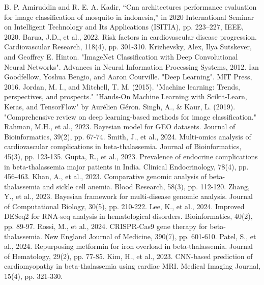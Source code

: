 \documentclass[a4paper,12pt,openbib,oneside]{memoir}
\theoremstyle{plain}
\theoremstyle{plain}
\theoremstyle{plain}
\theoremstyle{definition}
\theoremstyle{plain}
\theoremstyle{plain}
\theoremstyle{plain}
\begin{document}
\begin{thebibliography}{99}
 B. P. Amiruddin and R. E. A. Kadir, “Cnn architectures performance evaluation for image classification of mosquito in indonesia,” in 2020 International Seminar on Intelligent Technology and Its Applications (ISITIA), pp. 223–227, IEEE, 2020.
 Barua, J.D., et al., 2022. Risk factors in cardiovascular disease progression. Cardiovascular Research, 118(4), pp. 301-310.
 Krizhevsky, Alex, Ilya Sutskever, and Geoffrey E. Hinton. "ImageNet Classification with Deep Convolutional Neural Networks". Advances in Neural Information Processing Systems, 2012.
 Ian Goodfellow, Yoshua Bengio, and Aaron Courville. "Deep Learning". MIT Press, 2016.
 Jordan, M. I., and Mitchell, T. M. (2015). "Machine learning: Trends, perspectives, and prospects."
 "Hands-On Machine Learning with Scikit-Learn, Keras, and TensorFlow" by Aur\'elien G\'eron.
 Singh, A., \& Kaur, L. (2019). "Comprehensive review on deep learning-based methods for image classification."
 Rahman, M.H., et al., 2023. Bayesian model for GEO datasets. Journal of Bioinformatics, 39(2), pp. 67-74.
 Smith, J., et al., 2024. Multi-omics analysis of cardiovascular complications in beta-thalassemia. Journal of Bioinformatics, 45(3), pp. 123-135.
 Gupta, R., et al., 2023. Prevalence of endocrine complications in beta-thalassemia major patients in India. Clinical Endocrinology, 78(4), pp. 456-463.
 Khan, A., et al., 2023. Comparative genomic analysis of beta-thalassemia and sickle cell anemia. Blood Research, 58(3), pp. 112-120.
 Zhang, Y., et al., 2023. Bayesian framework for multi-disease genomic analysis. Journal of Computational Biology, 30(5), pp. 210-222.
 Lee, K., et al., 2024. Improved DESeq2 for RNA-seq analysis in hematological disorders. Bioinformatics, 40(2), pp. 89-97.
 Rossi, M., et al., 2024. CRISPR-Cas9 gene therapy for beta-thalassemia. New England Journal of Medicine, 390(7), pp. 601-610.
 Patel, S., et al., 2024. Repurposing metformin for iron overload in beta-thalassemia. Journal of Hematology, 29(2), pp. 77-85.
 Kim, H., et al., 2023. CNN-based prediction of cardiomyopathy in beta-thalassemia using cardiac MRI. Medical Imaging Journal, 15(4), pp. 321-330.
\end{thebibliography}
\end{document}
